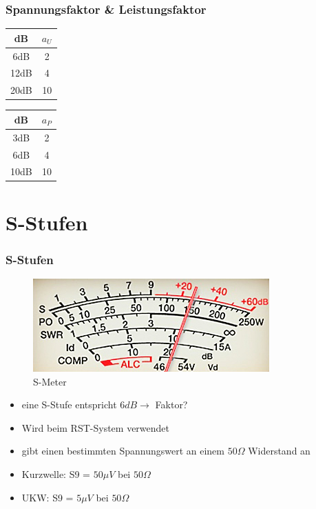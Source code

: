 \begin{frame}
\frametitle{Spannungsfaktor \& Leistungsfaktor}
\begin{center}
\begin{Huge}
\begin{minipage}{0.3\textwidth}
	\begin{tabular}{|c|c|}
		\hline
		\textbf{dB} & $a_{U}$ \\
		\hline \hline
		\alert{6dB}  & \alert{2}  \\ \hline
		12dB & 4  \\ \hline
		\alert{20dB} & \alert{10} \\ \hline
	\end{tabular}
\end{minipage}
\hspace{2cm}
\begin{minipage}{0.3\textwidth}
	\begin{tabular}{|c|c|}
		\hline
		\textbf{dB} & $a_{P}$ \\
		\hline \hline
		\alert{3dB}  & \alert{2}  \\ \hline
		6dB  & 4  \\ \hline
		\alert{10dB} & \alert{10} \\ \hline
	\end{tabular}
\end{minipage}
\end{Huge}
\end{center}
\end{frame}

\section*{S-Stufen}
\begin{frame}
\frametitle{S-Stufen}
\begin{center}
\begin{figure}
\includegraphics[scale=1.2]{e10/S-Meter.jpg}
\caption{S-Meter\cite{s-meter}}
\end{figure}
\begin{itemize}
	\item eine S-Stufe entspricht $6 dB \rightarrow$ Faktor?
	\item Wird beim RST-System verwendet
	\item gibt einen bestimmten Spannungswert an einem $50\Omega$ Widerstand an
	\item Kurzwelle: S9 = $50\mu V$ bei $50\Omega$
	\item UKW: S9 = $5\mu V$ bei $50\Omega$
\end{itemize}
\end{center}
\end{frame}

